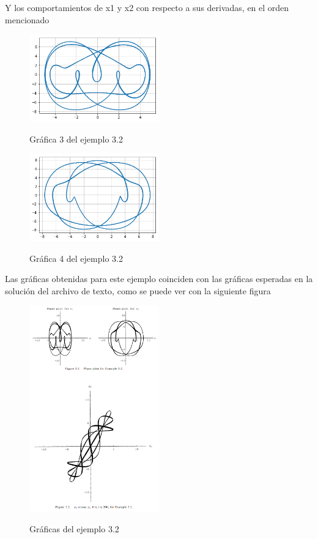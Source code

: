 \documentclass{article}
\begin{document}
Y los comportamientos de x1 y x2 con respecto a sus derivadas, en el orden mencionado
\begin{figure}[H]
    \caption{Gráfica 3 del ejemplo 3.2}
    \includegraphics[width=0.5\textwidth]{Grafica20.png}
    \centering
    \label{Cod}
\end{figure}
\begin{figure}[H]
    \caption{Gráfica 4 del ejemplo 3.2}
    \includegraphics[width=0.5\textwidth]{Grafica21.png}
    \centering
    \label{Cod}
\end{figure}
Las gráficas obtenidas para este ejemplo coinciden con las gráficas esperadas en la solución del archivo de texto, como se puede ver con la siguiente figura
\begin{figure}[H]
    \caption{Gráficas del ejemplo 3.2}
    \includegraphics[width=0.5\textwidth]{Ejemplo6.PNG}
    \centering
    \label{Cod}
\end{figure}
\end{document}
